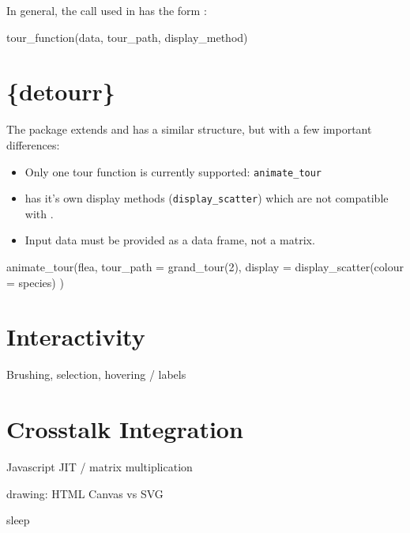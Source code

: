 In general, the call used in  has the form
\citep{tourr2011}:

\begin{Schunk}
\begin{Sinput}
tour_function(data, tour_path, display_method)
\end{Sinput}
\end{Schunk}

\hypertarget{detourr}{%
\section{\{detourr\}}\label{detourr}}

The  package extends  and has a similar
structure, but with a few important differences:

\begin{itemize}
\tightlist
\item
  Only one tour function is currently supported: \texttt{animate\_tour}
\item
   has it's own display methods (\texttt{display\_scatter})
  which are not compatible with .
\item
  Input data must be provided as a data frame, not a matrix.
\end{itemize}

\begin{Schunk}
\begin{Sinput}
animate_tour(flea,
  tour_path = grand_tour(2),
  display = display_scatter(colour = species)
)
\end{Sinput}
\end{Schunk}

\hypertarget{interactivity}{%
\section{Interactivity}\label{interactivity}}

Brushing, selection, hovering / labels

\hypertarget{crosstalk-integration}{%
\section{Crosstalk Integration}\label{crosstalk-integration}}

Javascript JIT / matrix multiplication

drawing: HTML Canvas vs SVG

sleep


